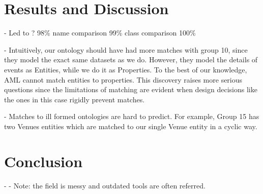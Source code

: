 \documentclass[runningheads,a4paper]{../../StyleFiles/llncs}
\begin{document}
\section{Results and Discussion}
- Led to ? 98\%  name comparison 99\% class comparison 100\%

- Intuitively, our ontology should have had more matches with group 10, since they model the exact same datasets as we do. However, they model the details of events as Entities, while we do it as Properties. To the best of our knowledge, AML cannot match entities to properties. This discovery raises more serious questions since the limitations of matching are evident when design decisions like the ones in this case rigidly prevent matches.

- Matches to ill formed ontologies are hard to predict. For example, Group 15 has two Venues entities which are matched to our single Venue entity in a cyclic way.

\section{Conclusion}
- 
- Note: the field is messy and outdated tools are often referred.





\end{document}
